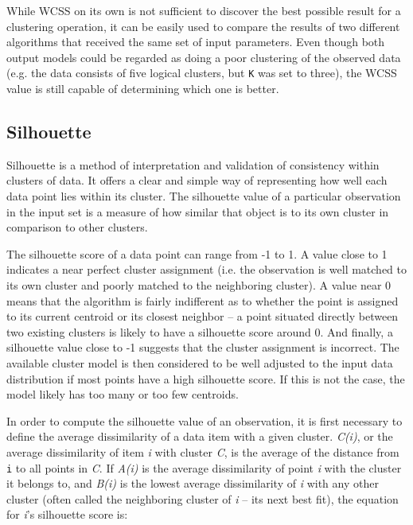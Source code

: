 \documentclass{l4proj}
\begin{document}
While WCSS on its own is not sufficient to discover the best possible result for a clustering operation, it can be easily used to compare the results of two different algorithms that received the same set of input parameters. Even though both output models could be regarded as doing a poor clustering of the observed data (e.g. the data consists of five logical clusters, but \texttt{K} was set to three), the WCSS value is still capable of determining which one is better.

\subsection{Silhouette}

Silhouette\cite{Silhouette} is a method of interpretation and validation of consistency within clusters of data. It offers a clear and simple way of representing how well each data point lies within its cluster. The silhouette value of a particular observation in the input set is a measure of how similar that object is to its own cluster in comparison to other clusters.

The silhouette score of a data point can range from -1 to 1. A value close to 1 indicates a near perfect cluster assignment (i.e. the observation is well matched to its own cluster and poorly matched to the neighboring cluster). A value near 0 means that the algorithm is fairly indifferent as to whether the point is assigned to its current centroid or its closest neighbor -- a point situated directly between two existing clusters is likely to have a silhouette score around 0. And finally, a silhouette value close to -1 suggests that the cluster assignment is incorrect. The available cluster model is then considered to be well adjusted to the input data distribution if most points have a high silhouette score. If this is not the case, the model likely has too many or too few centroids.

In order to compute the silhouette value of an observation, it is first necessary to define the average dissimilarity of a data item with a given cluster. \textit{C(i)}, or the average dissimilarity of item \textit{i} with cluster \textit{C}, is the average of the distance from \texttt{i} to all points in \textit{C}. If \textit{A(i)} is the average dissimilarity of point \textit{i} with the cluster it belongs to, and \textit{B(i)} is the lowest average dissimilarity of \textit{i} with any other cluster (often called the neighboring cluster of \textit{i} -- its next best fit), the equation for \textit{i}'s silhouette score is:
\end{document}
